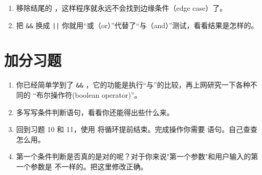 \begin{enumerate}
\item 移除结尾的 ，这样程序就永远不会找到边缘条件（edge case）了。
\item 把 \verb|&&| 换成 \verb,||, 你就用“或（or）”代替了“与（and）”测试，看看结果是怎样的。
\end{enumerate}

\section{加分习题}

\begin{enumerate}
\item 你已经简单学到了 \verb|&&| ，它的功能是执行“与”的比较，再上网研究一下各种不同的
“布尔操作符(boolean operator)”。
\item 多写写条件判断语句，看看你还能得出些什么来。
\item 回到习题 10 和 11，使用 将循环提前结束。完成操作你需要  
语句。自己查查怎么用。
\item 第一个条件判断是否真的是对的呢？对于你来说"第一个参数"和用户输入的第一个参数是
不一样的。把这里修改正确。
\end{enumerate}
